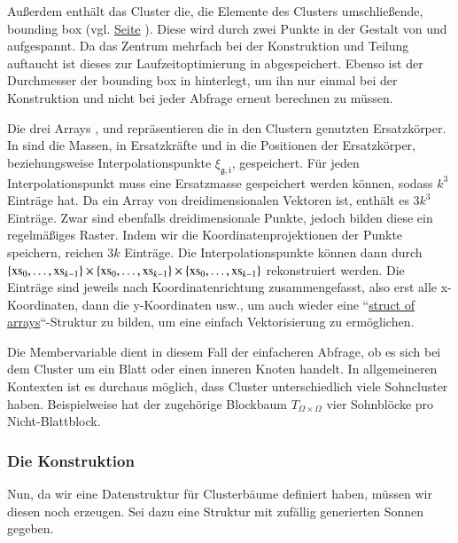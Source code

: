     Außerdem enthält das Cluster die, die Elemente des Clusters umschließende, bounding box (vgl. \hyperref[w:bbox]{Seite} \pageref{w:bbox}). Diese wird durch zwei Punkte in der Gestalt 
    von  und  aufgespannt. 
    Da das Zentrum mehrfach bei der Konstruktion und Teilung auftaucht ist dieses zur Laufzeitoptimierung in  abgespeichert.
    Ebenso ist der Durchmesser der bounding box in  hinterlegt, um ihn nur einmal bei der Konstruktion und nicht bei jeder Abfrage erneut berechnen zu müssen.
    
    Die drei Arrays ,  und  repräsentieren die in den Clustern genutzten Ersatzkörper. In  sind die  Massen, in  
    Ersatzkräfte und in  die Positionen der Ersatzkörper, beziehungsweise Interpolationspunkte $\xi_{\mathfrak{g}, \mathfrak{i}}$, gespeichert. Für jeden Interpolationspunkt muss
    eine Ersatzmasse gespeichert werden können, sodass  $k^3$ Einträge hat.
    Da  ein Array von dreidimensionalen Vektoren ist, enthält es $3 k^3$ Einträge. Zwar sind  ebenfalls dreidimensionale Punkte, jedoch bilden diese ein regelmäßiges Raster. Indem
    wir die Koordinatenprojektionen der Punkte speichern, reichen $3 k$ Einträge. Die Interpolationspunkte können dann durch 
    $\{\tcode{xs}_0, \dots ,\tcode{xs}_{k-1}\} \times \{\tcode{xs}_0, \dots ,\tcode{xs}_{k-1}\} \times \{\tcode{xs}_0, \dots ,\tcode{xs}_{k-1}\}$ rekonstruiert werden.
    Die Einträge sind jeweils nach Koordinatenrichtung zusammengefasst, also erst alle x-Koordinaten, dann die y-Koordinaten usw., um auch wieder eine ``\hyperref[w:aos]{struct of arrays}``-Struktur 
    zu bilden, um eine einfach Vektorisierung zu ermöglichen.
    
    Die Membervariable  dient in diesem Fall der einfacheren Abfrage, ob es sich bei dem Cluster um ein Blatt oder einen inneren Knoten handelt. In allgemeineren Kontexten 
    ist es durchaus möglich, dass Cluster unterschiedlich viele Sohncluster haben. Beispielweise hat der zugehörige Blockbaum $T_{\Omega \times \Omega}$ vier Sohnblöcke pro Nicht-Blattblock. 
    
    \subsubsection{Die Konstruktion}
    \label{sec:konstr}
    
    Nun, da wir eine Datenstruktur für Clusterbäume definiert haben, müssen wir diesen noch erzeugen. Sei dazu eine  Struktur mit zufällig generierten Sonnen gegeben.
    
